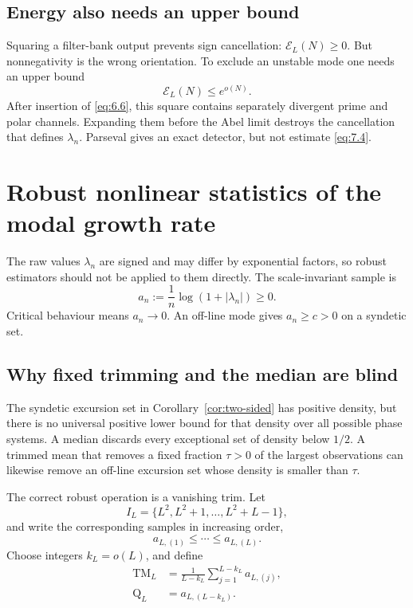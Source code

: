 \documentclass[11pt]{amsart}
\numberwithin{equation}{section}
\theoremstyle{definition}
\theoremstyle{remark}
\begin{document}
\subsection{Energy also needs an upper bound}

Squaring a filter-bank output prevents sign cancellation:
\(\mathcal E_L(N)\ge0\). But nonnegativity is the wrong orientation. To
exclude an unstable mode one needs an upper bound
\begin{equation}
 \mathcal E_L(N)\le e^{o(N)}.                            \label{eq:7.4}
\end{equation}
After insertion of \eqref{eq:6.6}, this square contains separately divergent
prime and polar channels. Expanding them before the Abel limit destroys the
cancellation that defines \(\lambda_n\). Parseval gives an exact detector,
but not estimate \eqref{eq:7.4}.

\section{Robust nonlinear statistics of the modal growth rate}
\label{sec:robust}

The raw values \(\lambda_n\) are signed and may differ by exponential
factors, so robust estimators should not be applied to them directly. The
scale-invariant sample is
\begin{equation}
 a_n:=\frac1n\log(1+|\lambda_n|)\ge0.                    \label{eq:8.1}
\end{equation}
Critical behaviour means \(a_n\to0\). An off-line mode gives
\(a_n\ge c>0\) on a syndetic set.

\subsection{Why fixed trimming and the median are blind}

The syndetic excursion set in Corollary~\ref{cor:two-sided} has positive
density, but there is no universal positive lower bound for that density
over all possible phase systems. A median discards every exceptional set
of density below \(1/2\). A trimmed mean that removes a fixed fraction
\(\tau>0\) of the largest observations can likewise remove an off-line
excursion set whose density is smaller than \(\tau\).

The correct robust operation is a vanishing trim. Let
\begin{equation}
 I_L=\{L^2,L^2+1,\ldots,L^2+L-1\},                       \label{eq:8.2}
\end{equation}
and write the corresponding samples in increasing order,
\[
 a_{L,(1)}\le\cdots\le a_{L,(L)}.
\]
Choose integers \(k_L=o(L)\), and define
\begin{equation}
\begin{aligned}
 \operatorname{TM}_L
   &=\frac1{L-k_L}\sum_{j=1}^{L-k_L}a_{L,(j)},\\
 \operatorname{Q}_L
   &=a_{L,(L-k_L)}.
\end{aligned}                                            \label{eq:8.3}
\end{equation}
\end{document}
